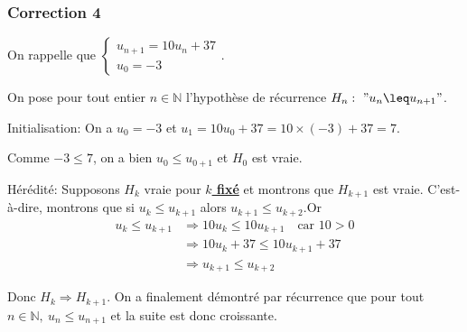 \documentclass[15pt, mathserif]{beamer}
\begin{document}
\begin{frame}
\vspace{-10mm}
	\frametitle{Correction 4}
\vspace{6.5mm}

On rappelle que $\begin{cases} u_{n+1} = 10u_n+37\\ u_0 = -3\end{cases}$.

\medskip

 On pose pour tout entier $n \in \mathbb{N}$ l'hypothèse de récurrence $H_n:~"u_n  \leq u_{n+1}"$.

\medskip

Initialisation: On a $u_0 =-3$ et $u_1 = 10u_0+37= 10\times\left(-3\right)+37=7$.

 Comme $-3 \leq 7$, on a bien $u_0  \leq u_{0+1}$ et $H_0$ est vraie.

\medskip

Hérédité: Supposons $H_k$ vraie pour \textbf\underline{{$k$ fixé}} et montrons que $H_{k+1}$ est vraie. C'est-à-dire, montrons que si $u_k  \leq u_{k+1}$ alors $u_{k+1}  \leq u_{k+2}$.Or \begin{align*} u_k  \leq u_{k+1} &\Rightarrow 10u_k \leq 10u_{k+1}\quad \text{car } 10>0\\
	 &\Rightarrow10u_k+37 \leq 10u_{k+1}+37\\
	 &\Rightarrow u_{k+1}  \leq u_{k+2}
\end{align*}

Donc $H_{k} \Rightarrow H_{k+1}$. On a finalement démontré par récurrence que pour tout $n \in\mathbb{N},~ u_n \leq u_{n+1}$ et la suite est donc croissante.\end{frame}
\end{document}
